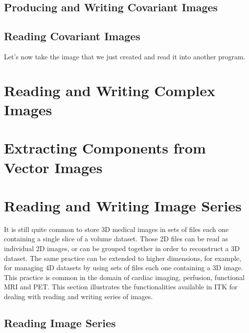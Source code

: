 \subsection{Producing and Writing Covariant Images}
\label{CovariantVectorImageWrite}
%

\subsection{Reading Covariant Images}
\label{CovariantVectorImageRead}
Let's now take the image that we just created and read it into another program.
%


\section{Reading and Writing Complex Images}
\label{sec:ComplexImagReadWrite}
%


\section{Extracting Components from Vector Images}
\label{sec:VectorImageExtractComponent}
%


\section{Reading and Writing Image Series}

It is still quite common to store 3D medical images in sets of files each one
containing a single slice of a volume dataset. Those 2D files can be read as
individual 2D images, or can be grouped together in order to reconstruct a 3D
dataset. The same practice can be extended to higher dimensions, for example,
for managing 4D datasets by using sets of files each one containing a 3D image.
This practice is common in the domain of cardiac imaging, perfusion, functional
MRI and PET. This section illustrates the functionalities available in ITK for
dealing with reading and writing series of images.


\subsection{Reading Image Series}
\label{sec:ReadingImageSeries}
%

